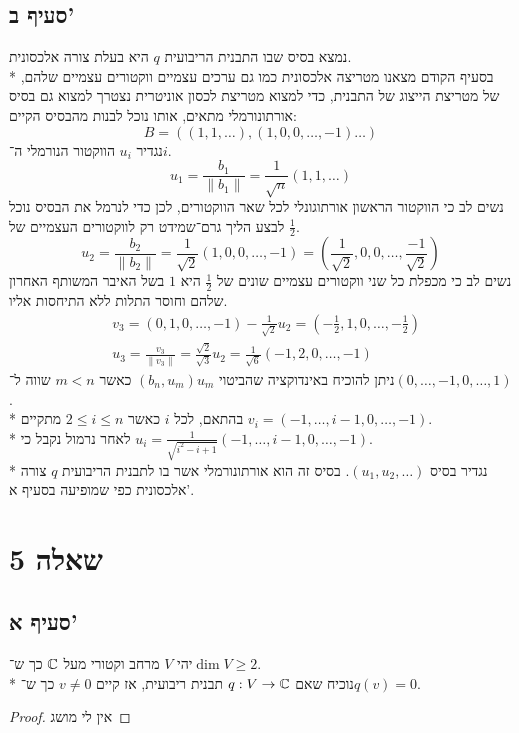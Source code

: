 \subsection{סעיף ב'}
נמצא בסיס שבו התבנית הריבועית $q$ היא בעלת צורה אלכסונית. \\*
בסעיף הקודם מצאנו מטריצה אלכסונית כמו גם ערכים עצמיים ווקטורים עצמיים שלהם, של מטריצת הייצוג של התבנית,
כדי למצוא מטריצת לכסון אוניטרית נצטרך למצוא גם בסיס אורתונורמלי מתאים, אותו נוכל לבנות מהבסיס הקיים:
\[
	B = \left( (1, 1, \hdots), (1, 0, 0, \hdots, -1) \hdots \right)
\]
נגדיר $u_i$ הווקטור הנורמלי ה־$i$.
\[
	u_1 = \frac{b_1}{\lVert b_1 \rVert} = \frac{1}{\sqrt{n}} (1, 1, \hdots)
\]
נשים לב כי הווקטור הראשון אורתוגונלי לכל שאר הווקטורים, לכן כדי לנרמל את הבסיס נוכל לבצע הליך גרם־שמידט רק לווקטורים העצמיים של $\frac{1}{2}$.
\[
	u_2 = \frac{b_2}{\lVert b_2 \rVert} = \frac{1}{\sqrt{2}} \left(1, 0, 0, \hdots, -1\right)
	= \left(\frac{1}{\sqrt{2}}, 0, 0, \hdots, \frac{-1}{\sqrt{2}}\right)
\]
נשים לב כי מכפלת כל שני ווקטורים עצמיים שונים של $\frac{1}{2}$ היא $1$ בשל האיבר המשותף האחרון שלהם וחוסר התלות ללא התיחסות אליו.
\begin{align*}
	& v_3 = (0, 1, 0, \hdots, -1) - \frac{1}{\sqrt{2}} u_2 = (-\frac{1}{2}, 1, 0, \hdots, -\frac{1}{2}) \\
	& u_3 = \frac{v_3}{\lVert v_3 \rVert} = \frac{\sqrt{2}}{\sqrt{3}} u_2 = \frac{1}{\sqrt{6}} (-1, 2, 0, \hdots, -1)
\end{align*}
ניתן להוכיח באינדוקציה שהביטוי $(b_n, u_m) u_m$ כאשר $m < n$ שווה ל־$(0, \hdots, -1, 0, \hdots, 1)$. \\*
בהתאם, לכל $i$ כאשר $2 \le i \le n$ מתקיים $v_i = (-1, \hdots, i - 1, 0, \hdots, -1)$. \\*
לאחר נרמול נקבל כי $u_i = \frac{1}{\sqrt{i^2 - i + 1}} (-1, \hdots, i - 1, 0, \hdots, -1)$. \\*
נגדיר בסיס $(u_1, u_2, \hdots)$. בסיס זה הוא אורתונורמלי אשר בו לתבנית הריבועית $q$ צורה אלכסונית כפי שמופיעה בסעיף א'.

\section{שאלה 5}
\subsection{סעיף א'}
יהי $V$ מרחב וקטורי מעל $\mathbb{C}$ כך ש־$\dim V \ge 2$. \\*
נוכיח שאם $q: V \to \mathbb{C}$ תבנית ריבועית, אז קיים $v \ne 0$ כך ש־$q(v) = 0$.
\begin{proof}
	אין לי מושג
\end{proof}


